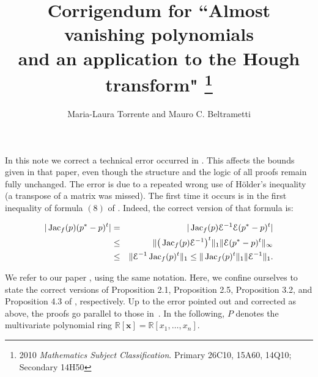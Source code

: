 \documentclass[10pt]{article}
\newcommand\sE{{\cal E}}
\newcommand{\x}{{\bm x}}
\newcommand\R{{\mathbb R}}
\def\Jac{\mathop{\rm Jac}\nolimits}
\begin{document}
\title{Corrigendum for   ``Almost vanishing polynomials \\and an  application  to the Hough transform"
\footnote{2010
{\em Mathematics Subject Classification}. Primary  26C10, 15A60, 14Q10;
Secondary 14H50  \newline
{} }}
\author{ Maria-Laura Torrente and Mauro C. Beltrametti }

\date{}
\maketitle


In this note we correct a technical error occurred in \cite{TB}.
 This affects the bounds given in  that paper, 
even though  the structure and the logic of all proofs remain  fully unchanged. The error is due to a repeated wrong use  of 
H\"older's inequality (a transpose of a matrix  was missed). The first time it occurs is  in the first inequality of formula $(8)$ of \cite{TB}.   Indeed, the correct version of that formula is:

\begin{eqnarray*}\label{diseq2}
 |\Jac_f(p) (p^*-p)^t| & = &  |\Jac_f(p) \sE^{-1} \sE (p^*-p)^t| \nonumber \\ 
 &\le&  \|\big(\Jac_f(p) \sE^{-1}\big)^t\|_1 \|\sE (p^*-p)^t\|_\infty \nonumber \\ 
 &\le& \|\sE^{-1}\Jac_f(p)^t \|_1 \le  \|\Jac_f(p)^t\|_1 \|\sE^{-1}\|_1.
\end{eqnarray*}



 We refer to our paper \cite{TB}, using the same notation.
Here, we confine ourselves to state the correct versions of 
 Proposition 2.1,  Proposition 2.5, Proposition 3.2, and Proposition 4.3 of \cite{TB}, respectively. Up to the error pointed out and corrected as above, the proofs go parallel to those in~\cite{TB}. In the following, $P$  denotes the multivariate polynomial ring $\R[\x]=\R[x_1,\ldots,x_n]$.
\end{document}
